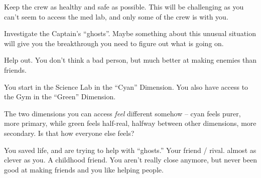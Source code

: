\documentclass[char]{TMFHope}
\begin{document}
\begin{itemz}[Goals]
	\item Keep the crew as healthy and safe as possible. This will be challenging as you can't seem to access the med lab, and only some of the crew is with you.
	\item Investigate the Captain's ``ghosts''. Maybe something about this unusual situation will give you the breakthrough you need to figure out what is going on.
	\item Help \cDip{} out. You don't think \cDip{\they} \cDip{\are} a bad person, but \cDip{\they} \cDip{\are} much better at making enemies than friends.
\end{itemz}

\begin{itemz}[Notes]
	\item You start in the Science Lab in the ``Cyan'' Dimension. You also have access to the Gym in the ``Green'' Dimension. 
	\item The two dimensions you can access {\em feel} different somehow -- cyan feels purer, more primary, while green feels half-real, halfway between other dimensions, more secondary.  Is that how everyone else feels?
\end{itemz}

\begin{contacts}
	\contact{\cCap{}} You saved \cCap{\their} life, and are trying to help \cCap{\them} with \cCap{\their} ``ghosts.''
	\contact{\cSci{}} Your friend / rival. \cSci{\They} \cSci{\are} almost as clever as you.
	\contact{\cDip{}} A childhood friend. You aren't really close anymore, but \cDip{\they} \cDip{\have} never been good at making friends and you like helping people.
\end{contacts}
\end{document}
